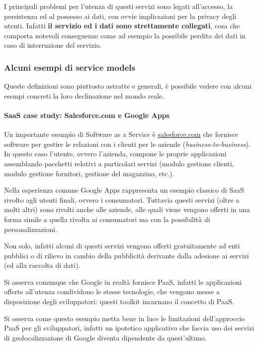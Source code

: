 \documentclass[italian,]{article}
\let\oldparagraph\paragraph
\renewcommand{\paragraph}[1]{\oldparagraph{#1}\mbox{}}
\begin{document}
I principali problemi per l'utenza di questi servizi sono legati
all'accesso, la persistenza ed al possesso ai dati, con ovvie
implicazioni per la privacy degli utenti. Infatti \textbf{il servizio ed
i dati sono strettamente collegati}, cosa che comporta notevoli
conseguenze come ad esempio la possibile perdita dei dati in caso di
interruzione del servizio.

\subsubsection{Alcuni esempi di service
models}\label{alcuni-esempi-di-service-models}

Queste definizioni sono piuttosto astratte e generali, è possibile
vedere con alcuni esempi concreti la loro declinazione nel mondo reale.

\paragraph{SaaS case study: Salesforce.com e Google
Apps}\label{saas-case-study-salesforce.com-e-google-apps}

Un importante esempio di Software as a Service è
\href{www.salesforce.com}{salesforce.com} che fornisce software per
gestire le relazioni con i clienti per le aziende
(\emph{business-to-business}). In questo caso l'utente, ovvero
l'azienda, compone le proprie applicazioni assemblando pacchetti
relativi a particolari servizi (modulo gestione clienti, modulo gestione
fornitori, gestione del magazzino, etc.).

Nella esperienza comune Google Apps rappresenta un esempio classico di
SaaS rivolto agli utenti finali, ovvero i consumatori. Tuttavia questi
servizi (oltre a molti altri) sono rivolti anche alle aziende, alle
quali viene vengono offerti in una forma simile a quella rivolta ai
consumatori ma con la possibilità di personalizzazioni.

Non solo, infatti alcuni di questi servizi vengono offerti gratuitamente
ad enti pubblici o di rilievo in cambio della pubblicità derivante dalla
adesione ai servizi (ed alla raccolta di dati).

Si osserva comunque che Google in realtà fornisce PaaS, infatti le
applicazioni offerte all'utenza condividono le stesse tecnologie, che
vengono messe a disposizione degli sviluppatori: questi toolkit
incarnano il concetto di PaaS.

Si osserva come questo esempio metta bene in luce le limitazioni
dell'approccio PaaS per gli sviluppatori, infatti un ipotetico
applicativo che faccia uso dei servizi di geolocalizzazione di Google
diventa dipendente da quest'ultimo.
\end{document}
